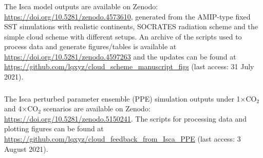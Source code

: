 \subsubsection{}

The Isca model outputs are available on Zenodo: \url{https://doi.org/10.5281/zenodo.4573610}, generated from the AMIP-type fixed SST simulations with realistic continents, SOCRATES radiation scheme and the simple cloud scheme with different setups. An archive of the scripts used to process data and generate figures/tables is available at \url{https://doi.org/10.5281/zenodo.4597263} and the updates can be found at \url{https://github.com/lqxyz/cloud_scheme_manuscript_figs} (last access: 31 July 2021).

\subsubsection{}

The Isca perturbed parameter ensemble (PPE) simulation outputs under 1$\times$CO$_2$ and 4$\times$CO$_2$ scenarios are available on Zenodo: \url{https://doi.org/10.5281/zenodo.5150241}. The scripts for processing data and plotting figures can be found at \url{https://github.com/lqxyz/cloud_feedback_from_Isca_PPE} (last access: 3 August 2021).
